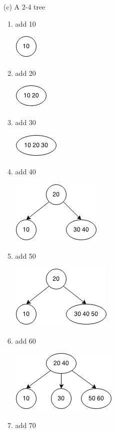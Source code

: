 \documentclass[10pt]{article}
\begin{document}
\begin{enumerate}
\begin{enumerate}
			\item[(c)] A 2-4 tree
				\begin{enumerate}
					\item add 10
					
						\includegraphics[scale=0.5]{images/29_8c_add10.png}
					\item add 20
					
						\includegraphics[scale=0.5]{images/29_8c_add20.png}
					\item add 30
					
						\includegraphics[scale=0.5]{images/29_8c_add30.png}
					\item add 40
					
						\includegraphics[scale=0.5]{images/29_8c_add40.png}
					\item add 50
					
						\includegraphics[scale=0.5]{images/29_8c_add50.png}
					\item add 60
					
						\includegraphics[scale=0.5]{images/29_8c_add60.png}
					\item add 70
					

\end{enumerate}
\end{enumerate}
\end{enumerate}
\end{document}
